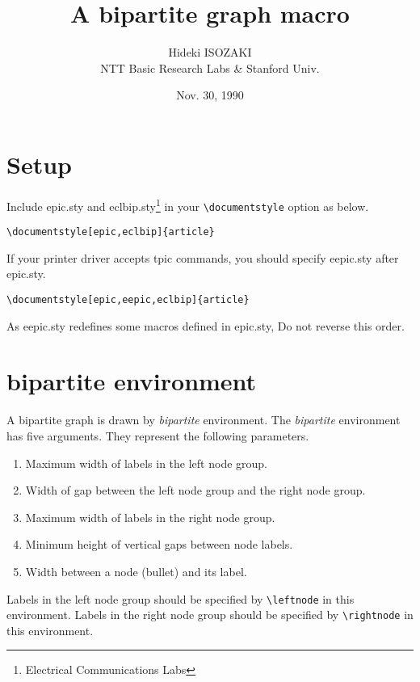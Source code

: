 

\title{A bipartite graph macro}

\author{Hideki ISOZAKI\\NTT Basic Research Labs \& Stanford Univ.}

\date{Nov. 30, 1990}



\maketitle

\section{Setup}

Include epic.sty and eclbip.sty\footnote{Electrical
Communications Labs}
in your \verb|\documentstyle|
option as below.
\begin{verbatim}
\documentstyle[epic,eclbip]{article}
\end{verbatim}
If your printer driver accepts tpic commands,
you should specify eepic.sty after epic.sty.
\begin{verbatim}
\documentstyle[epic,eepic,eclbip]{article}
\end{verbatim}
As eepic.sty redefines some macros defined in epic.sty,
Do not reverse this order.

\section{bipartite environment}

A bipartite graph is drawn by {\it bipartite} environment.
The {\it bipartite} environment has five arguments.
They represent the following parameters.
\begin{enumerate}
\item Maximum width of labels in the left node group.
\item Width of gap between the left node group and the right node group.
\item Maximum width of labels in the right node group.
\item Minimum height of vertical gaps between node labels.
\item Width between a node (bullet) and its label.
\end{enumerate}
Labels in the left node group 
should be specified by \verb|\leftnode| in this environment.
Labels in the right node group 
should be specified by \verb|\rightnode| in this environment.

